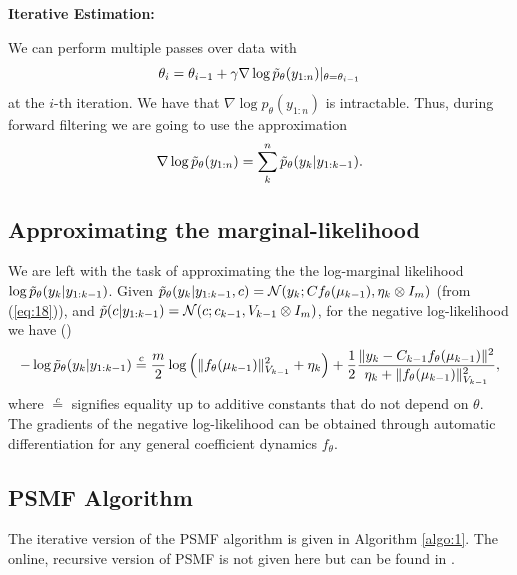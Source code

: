 \documentclass{mldsmsc}
\begin{document}
\noindent \textbf{Iterative Estimation:} \newline

\noindent We can perform multiple passes over data with 
\begin{equation}
    \theta_i = \theta_{i-1} + \gamma \nabla \log \Tilde{p}_{\theta}(y_{1:n}) \vert_{\theta = \theta_{i-1}}
\end{equation}
at the $i$-th iteration. We have that $\nabla \log p_{\theta}(y_{1:n})$ is intractable. Thus, during forward filtering we are going to use the approximation
\begin{equation}
    \nabla \log \Tilde{p}_{\theta}(y_{1:n}) = \sum_k^n \Tilde{p}_{\theta}(y_k | y_{1:k-1}).
\end{equation}

\subsection{Approximating the marginal-likelihood}\label{subsec:aml}

We are left with the task of approximating the the log-marginal likelihood $\log \Tilde{p}_{\theta}(y_k | y_{1:k-1})$. Given $\Tilde{p}_{\theta}(y_k | y_{1:k-1}, c) = \mathcal{N}(y_k; C f_{\theta}(\mu_{k-1}), \eta_k \otimes I_m)$ (from (\ref{eq:18})), and $\Tilde{p}(c | y_{1:k-1}) = \mathcal{N}(c; c_{k-1}, V_{k-1} \otimes I_m)$, for the negative log-likelihood we have (\cite{akyildiz2021probabilistic})
\begin{equation}
    -\log \Tilde{p}_{\theta}(y_k | y_{1:k-1}) \overset{c}{=} \frac{m}{2} \log \left(\Vert f_{\theta}(\mu_{k-1}) \Vert_{V_{k-1}}^2 + \eta_k\right) + \frac{1}{2} \frac{\Vert y_k - C_{k-1} f_{\theta}(\mu_{k-1}) \Vert^2}{\eta_k + \Vert f_{\theta}(\mu_{k-1}) \Vert^2_{V_{k-1}}},
\end{equation}
where $\overset{c}{=}$ signifies equality up to additive constants that do not depend on $\theta$. The gradients of the negative log-likelihood can be obtained through automatic differentiation for any general coefficient dynamics $f_{\theta}$.

\subsection{PSMF Algorithm}

The iterative version of the PSMF algorithm is given in Algorithm \ref{algo:1}. The online, recursive version of PSMF is not given here but can be found in \cite{akyildiz2021probabilistic}.
\end{document}
